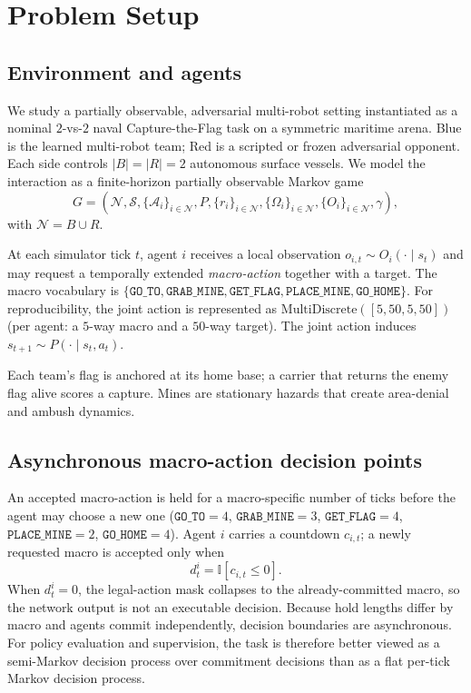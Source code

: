 \section{Problem Setup}
\label{sec:setup}

\subsection{Environment and agents}

We study a partially observable, adversarial multi-robot setting instantiated
as a nominal $2$-vs-$2$ naval Capture-the-Flag task on a symmetric maritime
arena. Blue is the learned multi-robot team; Red is a scripted or frozen
adversarial opponent. Each side controls $|B|=|R|=2$ autonomous surface vessels.
We model the interaction as a finite-horizon partially observable Markov game
\[
G =
\left(
\mathcal{N},\mathcal{S},\{\mathcal{A}_i\}_{i\in\mathcal{N}},P,
\{r_i\}_{i\in\mathcal{N}},\{\Omega_i\}_{i\in\mathcal{N}},\{O_i\}_{i\in\mathcal{N}},\gamma
\right),
\]
with $\mathcal{N}=B\cup R$.

At each simulator tick $t$, agent $i$ receives a local observation
$o_{i,t}\sim O_i(\cdot\mid s_t)$ and may request a temporally extended
\emph{macro-action} together with a target. The macro vocabulary is
$\{\texttt{GO\_TO},\texttt{GRAB\_MINE},\texttt{GET\_FLAG},\texttt{PLACE\_MINE},\texttt{GO\_HOME}\}$.
For reproducibility, the joint action is represented as
$\mathrm{MultiDiscrete}([5,50,5,50])$ (per agent: a $5$-way macro and a
$50$-way target). The joint action induces $s_{t+1}\sim P(\cdot\mid s_t,a_t)$.

Each team's flag is anchored at its home base; a carrier that returns the enemy
flag alive scores a capture. Mines are stationary hazards that create
area-denial and ambush dynamics.

\subsection{Asynchronous macro-action decision points}

An accepted macro-action is held for a macro-specific number of ticks before the
agent may choose a new one
($\texttt{GO\_TO}=4$, $\texttt{GRAB\_MINE}=3$, $\texttt{GET\_FLAG}=4$,
$\texttt{PLACE\_MINE}=2$, $\texttt{GO\_HOME}=4$). Agent $i$ carries a countdown
$c_{i,t}$; a newly requested macro is accepted only when
\[
d_t^i=\mathbb{I}\!\left[c_{i,t}\le 0\right].
\]
When $d_t^i=0$, the legal-action mask collapses to the already-committed macro,
so the network output is not an executable decision. Because hold lengths differ
by macro and agents commit independently, decision boundaries are asynchronous.
For policy evaluation and supervision, the task is therefore better viewed as a
semi-Markov decision process over commitment decisions than as a flat per-tick
Markov decision process.

